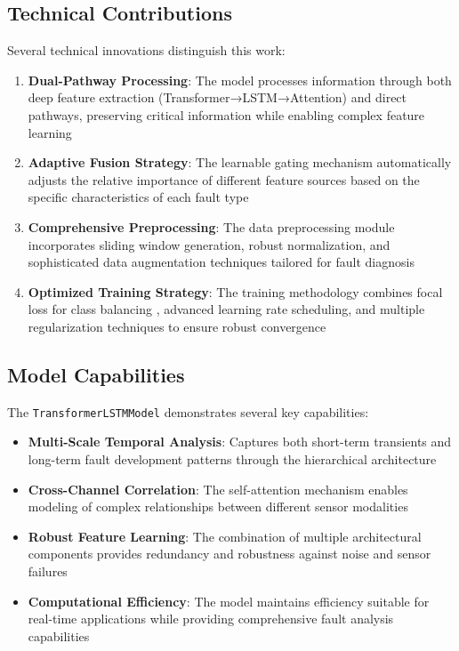 \subsection{Technical Contributions}

Several technical innovations distinguish this work:

\begin{enumerate}
    \item \textbf{Dual-Pathway Processing}: The model processes information through both deep feature extraction (Transformer→LSTM→Attention) and direct pathways, preserving critical information while enabling complex feature learning
    
    \item \textbf{Adaptive Fusion Strategy}: The learnable gating mechanism automatically adjusts the relative importance of different feature sources based on the specific characteristics of each fault type
    
    \item \textbf{Comprehensive Preprocessing}: The data preprocessing module incorporates sliding window generation, robust normalization, and sophisticated data augmentation techniques tailored for fault diagnosis \citep{wen2021time}
    
    \item \textbf{Optimized Training Strategy}: The training methodology combines focal loss for class balancing \citep{lin2017focal}, advanced learning rate scheduling, and multiple regularization techniques \citep{srivastava2014dropout, ba2016layer} to ensure robust convergence
\end{enumerate}

\subsection{Model Capabilities}

The \texttt{TransformerLSTMModel} demonstrates several key capabilities:

\begin{itemize}
    \item \textbf{Multi-Scale Temporal Analysis}: Captures both short-term transients and long-term fault development patterns through the hierarchical architecture
    \item \textbf{Cross-Channel Correlation}: The self-attention mechanism enables modeling of complex relationships between different sensor modalities
    \item \textbf{Robust Feature Learning}: The combination of multiple architectural components provides redundancy and robustness against noise and sensor failures
    \item \textbf{Computational Efficiency}: The model maintains efficiency suitable for real-time applications while providing comprehensive fault analysis capabilities
\end{itemize}

